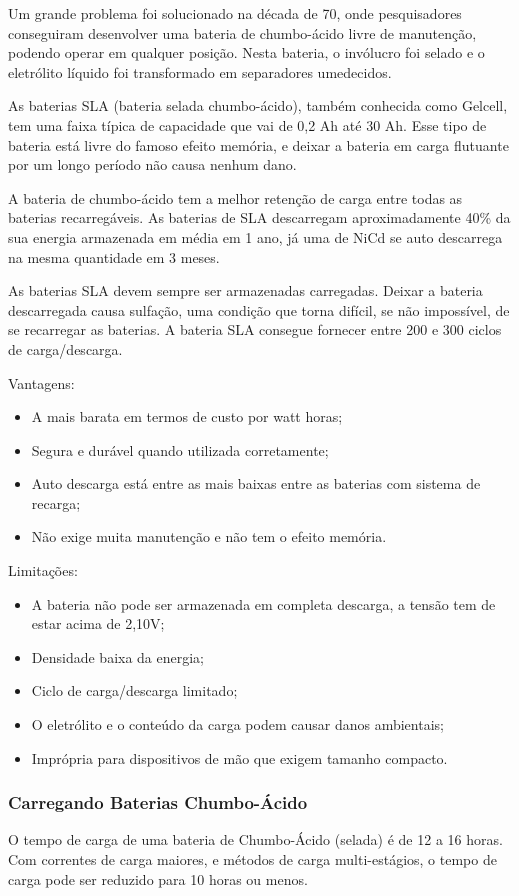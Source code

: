 Um grande problema foi solucionado na década de 70, onde pesquisadores conseguiram desenvolver uma bateria de chumbo-ácido livre de manutenção, podendo operar em qualquer posição. Nesta bateria, o invólucro foi selado e o eletrólito líquido foi transformado em separadores umedecidos.

As baterias SLA (bateria selada chumbo-ácido), também conhecida como Gelcell, tem uma faixa típica de capacidade que vai de 0,2 Ah até 30 Ah. Esse tipo de bateria está livre do famoso efeito memória, e deixar a bateria em carga flutuante por um longo período não causa nenhum dano.

A bateria de chumbo-ácido tem a melhor retenção de carga entre todas as baterias recarregáveis. As baterias de SLA descarregam aproximadamente 40\% da sua energia armazenada em média em 1 ano, já uma de NiCd se auto descarrega na mesma quantidade em 3 meses.

As baterias SLA devem sempre ser armazenadas carregadas. Deixar a bateria descarregada causa sulfação, uma condição que torna difícil, se não impossível, de se recarregar as baterias. A bateria SLA consegue fornecer entre 200 e 300 ciclos de carga/descarga.

Vantagens:
\begin{itemize}
 \item A mais barata em termos de custo por watt horas;
 \item Segura e durável quando utilizada corretamente;
 \item Auto descarga está entre as mais baixas entre as baterias com sistema de recarga;
 \item Não exige muita manutenção e não tem o efeito memória.
\end{itemize}

Limitações:
\begin{itemize}
 \item A bateria não pode ser armazenada em completa descarga, a tensão tem de estar acima de 2,10V;
 \item Densidade baixa da energia;
 \item Ciclo de carga/descarga limitado;
 \item O eletrólito e o conteúdo da carga podem causar danos ambientais;
 \item Imprópria para dispositivos de mão que exigem tamanho compacto.
\end{itemize}

\subsubsection{Carregando Baterias Chumbo-Ácido}
O tempo de carga de uma bateria de Chumbo-Ácido (selada) é de 12 a 16 horas. Com correntes de carga maiores, e métodos de carga multi-estágios, o tempo de carga pode ser reduzido para 10 horas ou menos.

